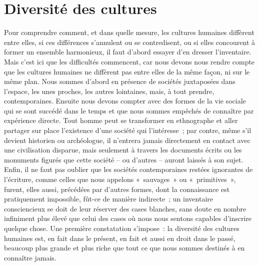 \documentclass[french,twoside]{book} %
\begin{document}
\section[{Diversité des cultures}]{Diversité des cultures}
\renewcommand{\leftmark}{Diversité des cultures}

\noindent Pour comprendre comment, et dans quelle mesure, les cultures humaines diffèrent entre elles, si ces différences s’annulent ou se contredisent, ou si elles concourent à former un ensemble harmonieux, il faut d’abord essayer d’en dresser l’inventaire. Mais c’est ici que les difficultés commencent, car nous devons nous rendre compte que les cultures humaines ne diffèrent pas entre elles de la même façon, ni sur le même plan. Nous sommes d’abord en présence de sociétés juxtaposées dans l’espace, les unes proches, les autres lointaines, mais, à tout prendre, contemporaines. Ensuite nous devons compter avec des formes de la vie sociale qui se sont succédé dans le temps et que nous sommes empêchés de connaître par expérience directe. Tout homme peut se transformer en ethnographe et aller partager sur place l’existence d’une société qui l’intéresse ; par contre, même s’il devient historien ou archéologue, il n’entrera jamais directement en contact avec une civilisation disparue, mais seulement à travers les documents écrits ou les monuments figurés que cette société – ou d’autres – auront laissés à son sujet. Enfin, il ne faut pas oublier que les sociétés contemporaines restées ignorantes de l’écriture, comme celles que nous appelons « sauvages » ou « primitives », furent, elles aussi, précédées par d’autres formes, dont la connaissance est pratiquement impossible, fût-ce de manière indirecte ; un inventaire consciencieux se doit de leur réserver des cases blanches, sans doute en nombre infiniment plus élevé que celui des cases où nous nous sentons capables d’inscrire quelque chose. Une première constatation s’impose : la diversité des cultures humaines est, en fait dans le présent, en fait et aussi en droit dans le passé, beaucoup plus grande et plus riche que tout ce que nous sommes destinés à en connaître jamais.\par
\end{document}
